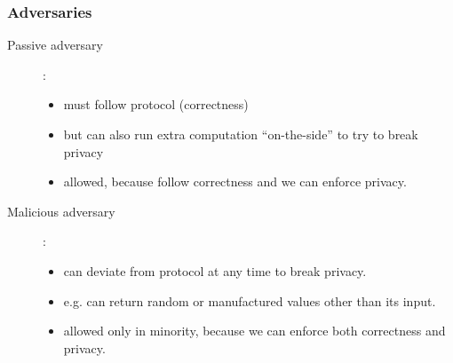 \documentclass[10pt]{beamer}
\begin{document}
\begin{frame}
\frametitle{Adversaries}

\begin{description}
\item[Passive adversary]:
\begin{itemize}
\item must follow protocol (correctness)
\item but can also run extra computation ``on-the-side'' to try to break
privacy
\item allowed, because follow correctness and we can enforce privacy.
\end{itemize}

\item[Malicious adversary]:
\begin{itemize}
\item can deviate from protocol at any time to break privacy.
\item e.g. can return random or manufactured values other than its input.
\item allowed only in minority, because we can enforce both correctness and privacy.
\end{itemize}

\end{description}

\end{frame}
\end{document}
